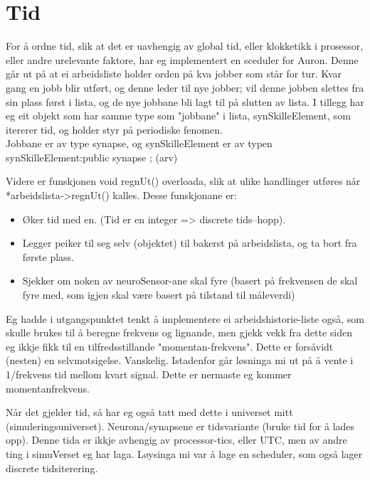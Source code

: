 

\chapter{Tid}

For å ordne tid, slik at det er uavhengig av global tid, eller klokketikk i prosessor, eller andre urelevante faktore, har eg implementert en sceduler for
Auron. Denne går ut på at ei arbeidsliste holder orden på kva jobber som står for tur. Kvar gang en jobb blir utført, og denne leder til nye jobber;
vil denne jobben slettes fra sin plass først i lista, og 
de nye jobbane bli lagt til på slutten av lista. I tillegg har eg eit objekt som har samme type som "jobbane" i lista, synSkilleElement, som itererer tid, og holder styr på periodiske fenomen.
	\\Jobbane er av type synapse, og synSkilleElement er av typen synSkilleElement:public synapse ; (arv) 

Videre er funskjonen void regnUt() overloada, slik at ulike handlinger utføres når *arbeidslista->regnUt() kalles.
Desse funskjonane er:
\begin{itemize} 	%
\item	Øker tid med en. (Tid er en integer => discrete tids--hopp).
\item	Legger peiker til seg selv (objektet) til bakerst på arbeidslista, og ta bort fra første plass.
\item Sjekker om noken av neuroSensor-ane skal fyre (basert på frekvensen de skal fyre med, som igjen skal være basert på tilstand til måleverdi)
\end{itemize}

Eg hadde i utgangspunktet tenkt å implementere ei arbeidshistorie-liste også, som skulle brukes til å beregne frekvens og lignande, men gjekk vekk fra dette
siden eg ikkje fikk til en tilfredsstillande "momentan-frekvens". Dette er forsåvidt (nesten) en selvmotsigelse. Vanskelig.
Istadenfor går løsninga mi ut på å vente i 1/frekvens tid mellom kvart signal. Dette er nermaste eg kommer momentanfrekvens.


Når det gjelder tid, så har eg også tatt med dette i universet mitt (simuleringsuniverset). Neurona/synapsene er tidsvariante (bruke tid for å lades opp). Denne tida er ikkje avhengig av processor-tics, eller UTC, men av andre ting i simuVerset eg har laga. Løysinga mi var å lage en scheduler, som også lager discrete tidsiterering.

